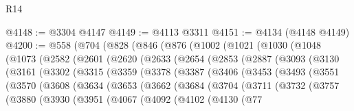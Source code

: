 \begin{lexlean}{R14}
\begin{coremodule}
@4148 := @3304 @4147
@4149 := @4113 @3311
@4151 := @4134 (@4148 @4149)
@4200 := @558
    (@704
      (@828
        (@846
          (@876
            (@1002
              (@1021
                (@1030
                  (@1048
                    (@1073
                      (@2582
                        (@2601
                          (@2620
                            (@2633
                              (@2654
                                (@2853
                                  (@2887
                                    (@3093
                                      (@3130
                                        (@3161
                                          (@3302
                                            (@3315
                                              (@3359
                                                (@3378
                                                  (@3387
                                                    (@3406
                                                      (@3453
                                                        (@3493
                                                          (@3551
                                                            (@3570
                                                              (@3608
                                                                (@3634
                                                                  (@3653
                                                                    (@3662
                                                                      (@3684
                                                                        (@3704
                                                                          (@3711
                                                                            (@3732
                                                                              (@3757
                                                                                (@3880
                                                                                  (@3930
                                                                                    (@3951
                                                                                      (@4067
                                                                                        (@4092
                                                                                          (@4102
                                                                                            (@4130
                                                                                              (@77

\end{coremodule}
\end{lexlean}
